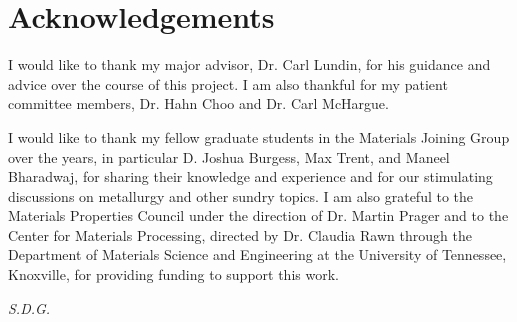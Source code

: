 \chapter*{Acknowledgements}
I would like to thank my major advisor, Dr. Carl Lundin, for his guidance and advice over the course of this project. I am also thankful for my patient committee members, Dr. Hahn Choo and Dr. Carl McHargue. 

I would like to thank my fellow graduate students in the Materials Joining Group over the years, in particular D. Joshua Burgess, Max Trent, and Maneel Bharadwaj, for sharing their knowledge and experience and for our stimulating discussions on metallurgy and other sundry topics. I am also grateful to the Materials Properties Council under the direction of Dr. Martin Prager and to the Center for Materials Processing, directed by Dr. Claudia Rawn through the Department of Materials Science and Engineering at the University of Tennessee, Knoxville, for providing funding to support this work.

\vfill
\centerline{\emph{S.D.G.}}